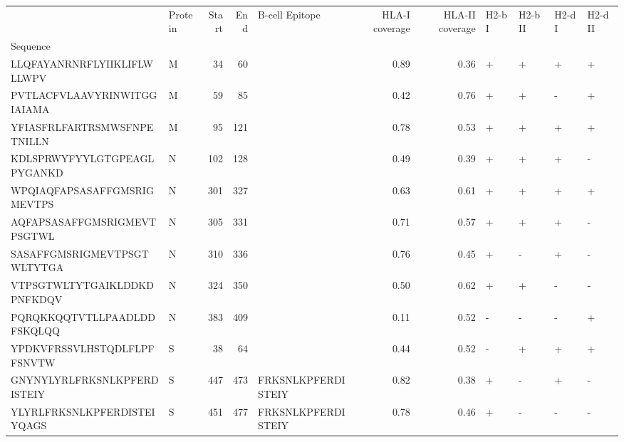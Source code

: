\begin{tabular}{llrrlrrllll}
\toprule
{} & Protein &  Start &   End &      B-cell Epitope &  HLA-I coverage &  HLA-II coverage & H2-b I & H2-b II & H2-d I & H2-d II \\
Sequence                    &         &        &       &                     &                 &                  &        &         &        &         \\
\midrule
LLQFAYANRNRFLYIIKLIFLWLLWPV &       M &     34 &    60 &                     &            0.89 &             0.36 &      + &       + &      + &       + \\
PVTLACFVLAAVYRINWITGGIAIAMA &       M &     59 &    85 &                     &            0.42 &             0.76 &      + &       + &      - &       + \\
YFIASFRLFARTRSMWSFNPETNILLN &       M &     95 &   121 &                     &            0.78 &             0.53 &      + &       + &      + &       + \\
KDLSPRWYFYYLGTGPEAGLPYGANKD &       N &    102 &   128 &                     &            0.49 &             0.39 &      + &       + &      + &       - \\
WPQIAQFAPSASAFFGMSRIGMEVTPS &       N &    301 &   327 &                     &            0.63 &             0.61 &      + &       + &      + &       + \\
AQFAPSASAFFGMSRIGMEVTPSGTWL &       N &    305 &   331 &                     &            0.71 &             0.57 &      + &       + &      + &       - \\
SASAFFGMSRIGMEVTPSGTWLTYTGA &       N &    310 &   336 &                     &            0.76 &             0.45 &      + &       - &      + &       - \\
VTPSGTWLTYTGAIKLDDKDPNFKDQV &       N &    324 &   350 &                     &            0.50 &             0.62 &      + &       + &      - &       - \\
PQRQKKQQTVTLLPAADLDDFSKQLQQ &       N &    383 &   409 &                     &            0.11 &             0.52 &      - &       - &      - &       + \\
YPDKVFRSSVLHSTQDLFLPFFSNVTW &       S &     38 &    64 &                     &            0.44 &             0.52 &      - &       + &      + &       + \\
GNYNYLYRLFRKSNLKPFERDISTEIY &       S &    447 &   473 &  FRKSNLKPFERDISTEIY &            0.82 &             0.38 &      + &       - &      + &       - \\
YLYRLFRKSNLKPFERDISTEIYQAGS &       S &    451 &   477 &  FRKSNLKPFERDISTEIY &            0.78 &             0.46 &      + &       - &      - &       - \\

\end{tabular}
